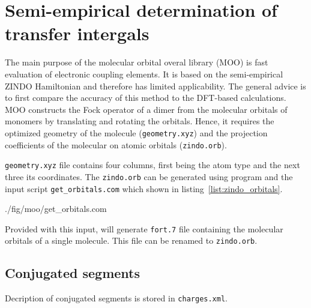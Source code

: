 \section{Semi-empirical determination of transfer intergals}
\label{sec:moo}

\newcommand{\xyz}{\texttt{geometry.xyz}\xspace}
\newcommand{\orb}{\texttt{zindo.orb}\xspace}

The main purpose of the molecular orbital overal library (MOO) is fast evaluation of electronic coupling elements. It is based on the semi-empirical ZINDO Hamiltonian and therefore has limited applicability. The general advice is to first compare the accuracy of this method to the DFT-based calculations. MOO constructs the Fock operator of a dimer from the  molecular orbitals of monomers by translating and rotating the orbitals. Hence, it requires the optimized geometry of the molecule (\xyz) and the projection coefficients of the molecular on atomic orbitals (\orb). 

\xyz file contains four columns, first being the atom type and the next three its coordinates. The \orb can be generated using \gaussian program and the input script \texttt{get\_orbitals.com} which shown in listing~\ref{list:zindo_orbitals}.

%
{./fig/moo/get_orbitals.com}

Provided with this input, \gaussian will generate \texttt{fort.7} file containing the molecular orbitals of a single molecule. This file can be renamed to \orb. 

\subsection{Conjugated segments}

Decription of conjugated segments is stored in \texttt{charges.xml}.

